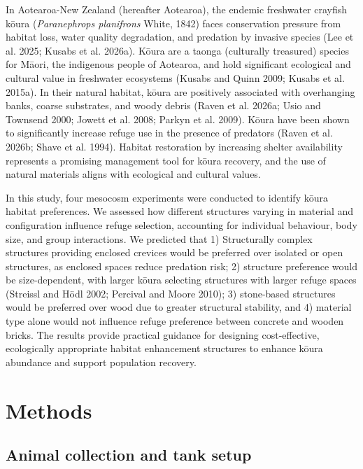 \documentclass[
  12pt,
  a4paper,
  oneside]{scrbook}
\begin{document}
In Aotearoa-New Zealand (hereafter Aotearoa), the endemic freshwater
crayfish kōura (\emph{Paranephrops planifrons} White, 1842) faces
conservation pressure from habitat loss, water quality degradation, and
predation by invasive species (Lee et al. 2025; Kusabs et al. 2026a).
Kōura are a taonga (culturally treasured) species for Māori, the
indigenous people of Aotearoa, and hold significant ecological and
cultural value in freshwater ecosystems (Kusabs and Quinn 2009; Kusabs
et al. 2015a). In their natural habitat, kōura are positively associated
with overhanging banks, coarse substrates, and woody debris (Raven et
al. 2026a; Usio and Townsend 2000; Jowett et al. 2008; Parkyn et al.
2009). Kōura have been shown to significantly increase refuge use in the
presence of predators (Raven et al. 2026b; Shave et al. 1994). Habitat
restoration by increasing shelter availability represents a promising
management tool for kōura recovery, and the use of natural materials
aligns with ecological and cultural values.

In this study, four mesocosm experiments were conducted to identify
kōura habitat preferences. We assessed how different structures varying
in material and configuration influence refuge selection, accounting for
individual behaviour, body size, and group interactions. We predicted
that 1) Structurally complex structures providing enclosed crevices
would be preferred over isolated or open structures, as enclosed spaces
reduce predation risk; 2) structure preference would be size-dependent,
with larger kōura selecting structures with larger refuge spaces
(Streissl and Hödl 2002; Percival and Moore 2010); 3) stone-based
structures would be preferred over wood due to greater structural
stability, and 4) material type alone would not influence refuge
preference between concrete and wooden bricks. The results provide
practical guidance for designing cost-effective, ecologically
appropriate habitat enhancement structures to enhance kōura abundance
and support population recovery.

\section{Methods}\label{methods-2}

\subsection{Animal collection and tank
setup}\label{animal-collection-and-tank-setup}
\end{document}
